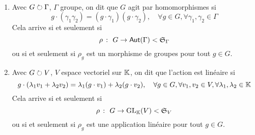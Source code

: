 \begin{definition}\,
    \begin{enumerate}[label=(\roman*)]
        \item Avec \(G\circlearrowright\Gamma\), \(\Gamma\) groupe, on dit que \(G\) agit par
        homomorphismes si
        \begin{equation*}
            g\cdot(\gamma_1\gamma_2) = (g\cdot\gamma_1)(g\cdot\gamma_2),\quad\forall g\in G,\forall\gamma_1,\gamma_2\in\Gamma
        \end{equation*}
        Cela arrive si et seulement si
        \begin{equation*}
            \rho\ \colon\ G\to\aut(\Gamma) < {\mathfrak{S}}_\Gamma
        \end{equation*}
        ou si et seulement si \(\rho_g\) est un morphisme de groupes pour tout \(g\in G\).

        \item Avec \(G\circlearrowright V\), \(V\) espace vectoriel sur \(\mathbb{K}\), on dit que 
        l'action est linéaire si
        \begin{equation*}
            g\cdot(\lambda_1 v_1 + \lambda_2 v_2) = \lambda_1(g\cdot v_1) + \lambda_2(g\cdot v_2),\quad\forall g\in G,\forall v_1,v_2\in V,\forall\lambda_1,\lambda_2\in\mathbb{K}
        \end{equation*}
        Cela arrive si et seulement si
        \begin{equation*}
            \rho\ \colon\ G\to\glx{\bb K}(V) < {\mathfrak{S}}_V
        \end{equation*}
        ou si et seulement si \(\rho_g\) est une application linéaire pour tout \(g\in G\).
    \end{enumerate}
\end{definition}


